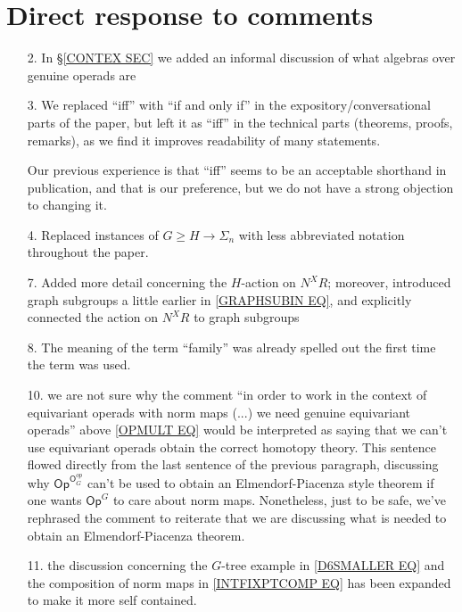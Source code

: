 \documentclass{article}
\begin{document}
\section{Direct response to comments}

\begin{itemize}
	\item[2.] In \S \ref{CONTEX SEC} we added an informal discussion of what algebras over genuine operads are
	
	\item[3.] We replaced ``iff'' with ``if and only if''
	in the expository/conversational parts of the paper, 
	but left it as ``iff'' in the technical parts (theorems, proofs, remarks), as we find it improves readability of many statements.
	
	Our previous experience is that ``iff'' seems to be an acceptable shorthand in publication, and that is our preference,
	but we do not have a strong objection to changing it.


        \item[4.] Replaced instances of $G \geq H \to \Sigma_n$ with less abbreviated notation throughout the paper.
        
      
	\item[7.] Added more detail concerning the 
	$H$-action on $N^X R$;
	moreover, introduced graph subgroups a little earlier in
	\eqref{GRAPHSUBIN EQ},
	and explicitly connected the action on 
	$N^X R$ to graph subgroups
	
	\item[8.] The meaning of the term ``family''
	was already spelled out the first time the term was used.

	\item[10.] we are not sure why the comment 
	``in order to work in the context of equivariant operads with norm maps (...) we need genuine equivariant operads''
	above \eqref{OPMULT EQ}
	would be interpreted as saying that we can't use equivariant operads obtain the correct homotopy theory.
	This sentence flowed directly from the last sentence of the previous paragraph, discussing why
	$\mathsf{Op}^{\mathsf{O}_G^{op}}$
	can't be used to obtain an Elmendorf-Piacenza style theorem if one wants $\mathsf{Op}^G$ to care about norm maps.
	Nonetheless, just to be safe, we've rephrased the comment to reiterate that we are discussing what is needed to obtain
	an Elmendorf-Piacenza theorem.
	
	\item[11.] the discussion concerning 
	the $G$-tree example in
	\eqref{D6SMALLER EQ}
	and 
	the composition of norm maps in
	\eqref{INTFIXPTCOMP EQ}
	has been expanded to make it more self contained.
	

\end{itemize}
\end{document}
